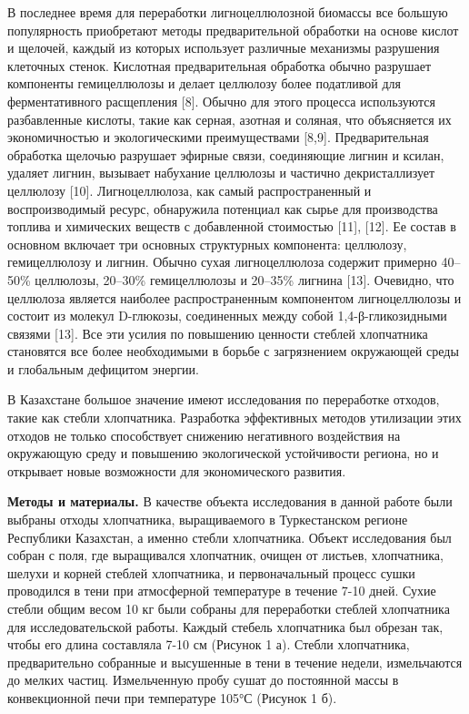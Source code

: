 В последнее время для переработки лигноцеллюлозной биомассы все большую
популярность приобретают методы предварительной обработки на основе
кислот и щелочей, каждый из которых использует различные механизмы
разрушения клеточных стенок. Кислотная предварительная обработка обычно
разрушает компоненты гемицеллюлозы и делает целлюлозу более податливой
для ферментативного расщепления {[}8{]}. Обычно для этого процесса
используются разбавленные кислоты, такие как серная, азотная и соляная,
что объясняется их экономичностью и экологическими преимуществами
{[}8,9{]}. Предварительная обработка щелочью разрушает эфирные связи,
соединяющие лигнин и ксилан, удаляет лигнин, вызывает набухание
целлюлозы и частично декристаллизует целлюлозу {[}10{]}. Лигноцеллюлоза,
как самый распространенный и воспроизводимый ресурс, обнаружила
потенциал как сырье для производства топлива и химических веществ с
добавленной стоимостью {[}11{]}, {[}12{]}. Ее состав в основном включает
три основных структурных компонента: целлюлозу, гемицеллюлозу и лигнин.
Обычно сухая лигноцеллюлоза содержит примерно 40--50\% целлюлозы,
20--30\% гемицеллюлозы и 20--35\% лигнина {[}13{]}. Очевидно, что
целлюлоза является наиболее распространенным компонентом лигноцеллюлозы
и состоит из молекул D-глюкозы, соединенных между собой
1,4-β-гликозидными связями {[}13{]}. Все эти усилия по повышению
ценности стеблей хлопчатника становятся все более необходимыми в борьбе
с загрязнением окружающей среды и глобальным дефицитом энергии.

В Казахстане большое значение имеют исследования по переработке отходов,
такие как стебли хлопчатника. Разработка эффективных методов утилизации
этих отходов не только способствует снижению негативного воздействия на
окружающую среду и повышению экологической устойчивости региона, но и
открывает новые возможности для экономического развития.

{\bfseries Методы и материалы.} В качестве объекта исследования в данной
работе были выбраны отходы хлопчатника, выращиваемого в Туркестанском
регионе Республики Казахстан, а именно стебли хлопчатника. Объект
исследования был собран с поля, где выращивался хлопчатник, очищен от
листьев, хлопчатника, шелухи и корней стеблей хлопчатника, и
первоначальный процесс сушки проводился в тени при атмосферной
температуре в течение 7-10 дней. Сухие стебли общим весом 10 кг были
собраны для переработки стеблей хлопчатника для исследовательской
работы. Каждый стебель хлопчатника был обрезан так, чтобы его длина
составляла 7-10 см (Рисунок 1 а). Стебли хлопчатника, предварительно
собранные и высушенные в тени в течение недели, измельчаются до мелких
частиц. Измельченную пробу сушат до постоянной массы в конвекционной
печи при температуре 105°С (Рисунок 1 б).


